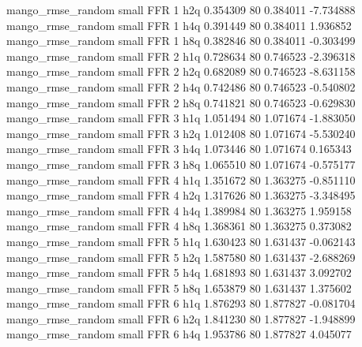 mango_rmse_random      small      FFR                 1                  h2q 0.354309 80       0.384011          -7.734888
mango_rmse_random      small      FFR                 1                  h4q 0.391449 80       0.384011           1.936852
mango_rmse_random      small      FFR                 1                  h8q 0.382846 80       0.384011          -0.303499
mango_rmse_random      small      FFR                 2                  h1q 0.728634 80       0.746523          -2.396318
mango_rmse_random      small      FFR                 2                  h2q 0.682089 80       0.746523          -8.631158
mango_rmse_random      small      FFR                 2                  h4q 0.742486 80       0.746523          -0.540802
mango_rmse_random      small      FFR                 2                  h8q 0.741821 80       0.746523          -0.629830
mango_rmse_random      small      FFR                 3                  h1q 1.051494 80       1.071674          -1.883050
mango_rmse_random      small      FFR                 3                  h2q 1.012408 80       1.071674          -5.530240
mango_rmse_random      small      FFR                 3                  h4q 1.073446 80       1.071674           0.165343
mango_rmse_random      small      FFR                 3                  h8q 1.065510 80       1.071674          -0.575177
mango_rmse_random      small      FFR                 4                  h1q 1.351672 80       1.363275          -0.851110
mango_rmse_random      small      FFR                 4                  h2q 1.317626 80       1.363275          -3.348495
mango_rmse_random      small      FFR                 4                  h4q 1.389984 80       1.363275           1.959158
mango_rmse_random      small      FFR                 4                  h8q 1.368361 80       1.363275           0.373082
mango_rmse_random      small      FFR                 5                  h1q 1.630423 80       1.631437          -0.062143
mango_rmse_random      small      FFR                 5                  h2q 1.587580 80       1.631437          -2.688269
mango_rmse_random      small      FFR                 5                  h4q 1.681893 80       1.631437           3.092702
mango_rmse_random      small      FFR                 5                  h8q 1.653879 80       1.631437           1.375602
mango_rmse_random      small      FFR                 6                  h1q 1.876293 80       1.877827          -0.081704
mango_rmse_random      small      FFR                 6                  h2q 1.841230 80       1.877827          -1.948899
mango_rmse_random      small      FFR                 6                  h4q 1.953786 80       1.877827           4.045077
